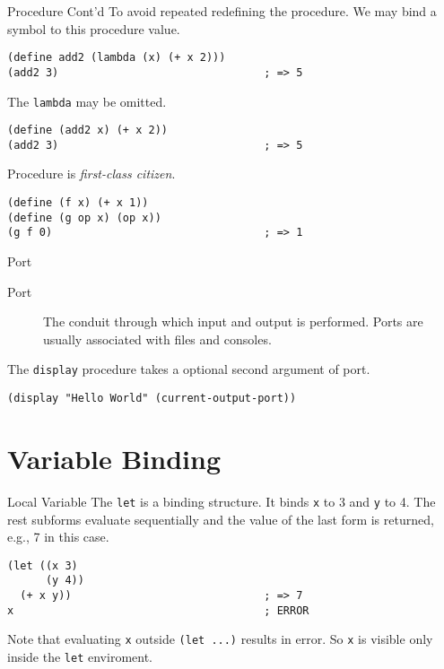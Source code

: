 \documentclass[presentation]{beamer}
\begin{document}
\begin{frame}[fragile,label={sec:orgheadline39}]{Procedure Cont'd}
 To avoid repeated redefining the procedure.  We may bind a symbol
to this procedure value.

\begin{verbatim}
(define add2 (lambda (x) (+ x 2)))
(add2 3)                                ; => 5
\end{verbatim}

The \texttt{lambda} may be omitted.

\begin{verbatim}
(define (add2 x) (+ x 2))
(add2 3)                                ; => 5
\end{verbatim}

Procedure is \emph{first-class citizen}.

\begin{verbatim}
(define (f x) (+ x 1))
(define (g op x) (op x))
(g f 0)                                 ; => 1
\end{verbatim}
\end{frame}



\begin{frame}[fragile,label={sec:orgheadline40}]{Port}
 \begin{description}
\item[{Port}] The conduit through which input and output is performed.
Ports are usually associated with files and consoles.
\end{description}


The \texttt{display} procedure takes a optional second argument of port.

\begin{verbatim}
(display "Hello World" (current-output-port))
\end{verbatim}
\end{frame}

\section{Variable Binding}
\label{sec:orgheadline46}

\begin{frame}[fragile,label={sec:orgheadline42}]{Local Variable}
 The \texttt{let} is a binding structure.  It binds \texttt{x} to 3 and \texttt{y} to 4.
The rest subforms evaluate sequentially and the value of the last
form is returned, e.g., 7 in this case.

\begin{verbatim}
(let ((x 3)
      (y 4))
  (+ x y))                              ; => 7
x                                       ; ERROR
\end{verbatim}

Note that evaluating \texttt{x} outside \texttt{(let ...)} results in error.  So
\texttt{x} is visible only inside the \texttt{let} enviroment.
\end{frame}
\end{document}
